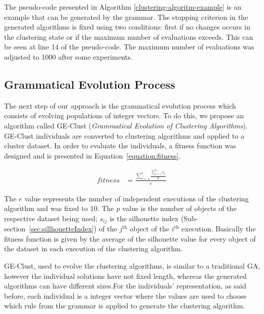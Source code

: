 \documentclass[conference,compsoc]{IEEEtran}
\begin{document}
The pseudo-code presented in Algorithm \ref{clustering-algoritm-example} is an example that can be generated by the grammar. The stopping criterion in the generated algorithms is fixed using two conditions: first if no changes occurs in the clustering state or if the maximum number of evaluations exceeds. This can be seen at line 14 of the pseudo-code. The maximum number of evaluations was adjusted to 1000 after some experiments.


\subsection{Grammatical Evolution Process}

The next step of our approach is the grammatical evolution process which consists of evolving populations of integer vectors. To do this, we propose an algorithm called GE-Clust ({\it Grammatical Evolution of Clustering Algorithms}). GE-Clust individuals are converted to clustering algorithms and applied to a cluster dataset. In order to evaluate the individuals, a fitness function was designed and is presented in Equation~\ref{equation:fitness}.

\begin{align}
\label{equation:fitness}
fitness    &= \frac{\sum_{i=1}^e \frac{\sum_{j=1}^{p} s_{ij}}{p}}{e}
\
\end{align}

The $e$ value represents the number of independent executions of the clustering algorithm and was fixed to 10. The $p$ value is the number of objects of the respective dataset being used; $s_{ij}$ is the silhouette index (Sub-section~\ref{sec:sillhouetteIndex}) of the $j^{\text{th}}$ object of the $i^{\text{th}}$ execution. Basically the fitness function is given by the average of the silhouette value for every object of the dataset in each execution of the clustering algorithm.

GE-Clust, used to evolve the clustering algorithms, is similar to a traditional GA, however the individual solutions have not fixed length, whereas the generated algorithms can have different sizes.For the individuals' representation, as said before, each individual is a integer vector where the values are used to choose which rule from the grammar is applied to generate the clustering algorithm.
\end{document}
